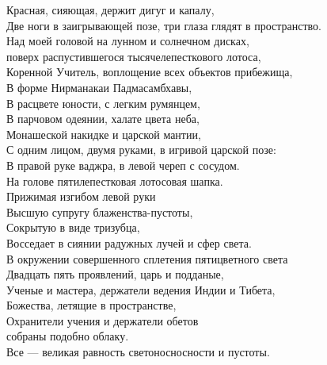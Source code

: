 Красная, сияющая, держит дигуг и капалу,\\
Две ноги в заигрывающей позе, три глаза глядят в пространство.\\
Над моей головой на лунном и солнечном дисках, \\
поверх распустившегося тысячелепесткового лотоса,\\
Коренной Учитель, воплощение всех объектов прибежища,\\
В форме Нирманакаи Падмасамбхавы,\\
В расцвете юности, с легким румянцем,\\
В парчовом одеянии, халате цвета неба, \\
Монашеской накидке и царской мантии,\\
С одним лицом, двумя руками, в игривой царской позе:\\
В правой руке ваджра, в левой череп с сосудом.\\
На голове пятилепестковая лотосовая шапка.\\
Прижимая изгибом левой руки \\
Высшую супругу блаженства-пустоты,\\
Сокрытую в виде тризубца,\\
Восседает в сиянии радужных лучей и сфер света.\\
В окружении совершенного сплетения пятицветного света\\
Двадцать пять проявлений, царь и подданые,\\
Ученые и мастера, держатели ведения Индии и Тибета, \\
Божества, летящие в пространстве, \\
Охранители учения и держатели обетов \\ \indent собраны подобно облаку.\\
Все — великая равность светоносносности и пустоты.
\newpage
